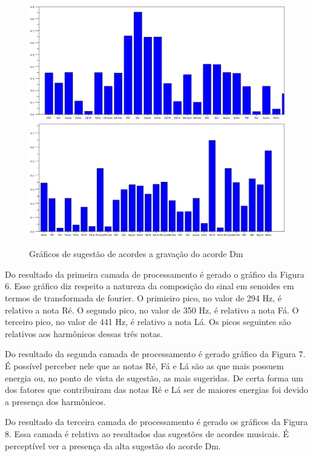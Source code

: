 \begin{figure}[h]
	\centering
		\includegraphics[keepaspectratio=true,scale=0.49]{figuras/Dm/acordes_1_Dm.eps}
		\includegraphics[keepaspectratio=true,scale=0.49]{figuras/Dm/acordes_2_Dm.eps}
	\caption{Gráficos de sugestão de acordes a gravação do acorde Dm}
\end{figure}
\newpage

Do resultado da primeira camada de processamento é gerado o gráfico da Figura 6. Esse gráfico diz respeito a natureza da composição do sinal em senoides em termos de transformada de fourier. O primieiro pico, no valor de 294 Hz, é relativo a nota Ré. O segundo pico, no valor de 350 Hz, é relativo a nota Fá. O terceiro pico, no valor de 441 Hz, é relativo a nota Lá. Os picos seguintes são relativos aos harmônicos dessas três notas. 

Do resultado da segunda camada de processamento é gerado gráfico da Figura 7. É possível perceber nele que as notas Ré, Fá e Lá são as que mais possuem energia ou, no ponto de vista de sugestão, as mais sugeridas. De certa forma um dos fatores que contribuiram das notas Ré e Lá ser de maiores energias foi devido a presença dos harmônicos.

Do resultado da terceira camada de processamento é gerado os gráficos da Figura 8. Essa camada é relativa ao resultados das sugestões de acordes musicais. É perceptível ver a presença da alta sugestão do acorde Dm.

